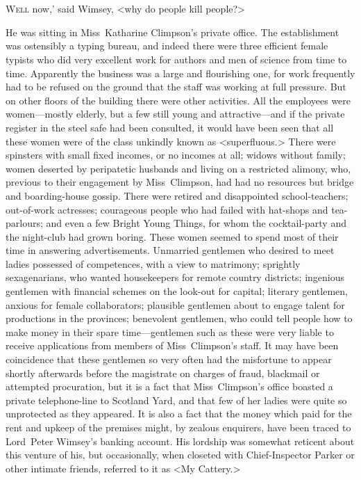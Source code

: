 \chapter[Chapter \thechapter]{}
\lettrine[ante=`]{W}{ell}  now,' said Wimsey, <why do people kill people?>

\zz
He was sitting in Miss~Katharine Climpson's private office. The establishment was ostensibly a typing bureau, and indeed there were three efficient female typists who did very excellent work for authors and men of science from time to time. Apparently the business was a large and flourishing one, for work frequently had to be refused on the ground that the staff was working at full pressure. But on other floors of the building there were other activities. All the employees were women—mostly elderly, but a few still young and attractive—and if the private register in the steel safe had been consulted, it would have been seen that all these women were of the class unkindly known as <superfluous.> There were spinsters with small fixed incomes, or no incomes at all; widows without family; women deserted by peripatetic husbands and living on a restricted alimony, who, previous to their engagement by Miss~Climpson, had had no resources but bridge and boarding-house gossip. There were retired and disappointed school-teachers; out-of-work actresses; courageous people who had failed with hat-shops and tea-parlours; and even a few Bright Young Things, for whom the cocktail-party and the night-club had grown boring. These women seemed to spend most of their time in answering advertisements. Unmarried gentlemen who desired to meet ladies possessed of competences, with a view to matrimony; sprightly sexagenarians, who wanted housekeepers for remote country districts; ingenious gentlemen with financial schemes on the look-out for capital; literary gentlemen, anxious for female collaborators; plausible gentlemen about to engage talent for productions in the provinces; benevolent gentlemen, who could tell people how to make money in their spare time—gentlemen such as these were very liable to receive applications from members of Miss~Climpson's staff. It may have been coincidence that these gentlemen so very often had the misfortune to appear shortly afterwards before the magistrate on charges of fraud, blackmail or attempted procuration, but it is a fact that Miss~Climpson's office boasted a private telephone-line to Scotland Yard, and that few of her ladies were quite so unprotected as they appeared. It is also a fact that the money which paid for the rent and upkeep of the premises might, by zealous enquirers, have been traced to Lord~Peter Wimsey's banking account. His lordship was somewhat reticent about this venture of his, but occasionally, when closeted with Chief-Inspector Parker or other intimate friends, referred to it as <My Cattery.>

